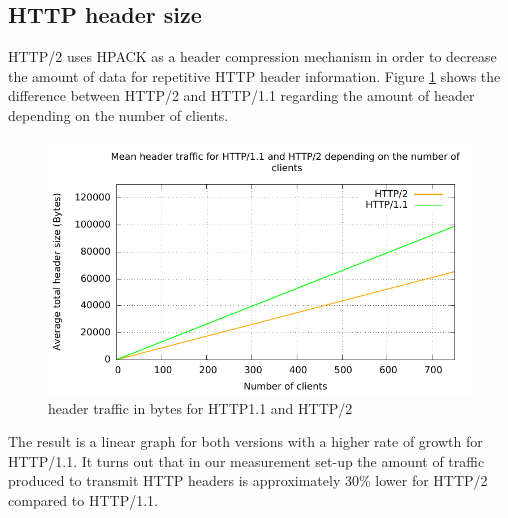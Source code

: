 \subsection{HTTP header size}
\label{subsec:header_size}

HTTP/2 uses HPACK \cite{hpack} as a header compression mechanism in order to decrease the amount of data for repetitive HTTP header information. Figure \ref{fig:headersize} shows the difference between HTTP/2 and HTTP/1.1 regarding the amount of header depending on the number of clients.

\begin{figure}[H]
	\centering
	\includegraphics[scale=1,trim=0.0cm .0cm .0cm .0cm,clip]{images/headertraffic.pdf}
	\caption{header traffic in bytes for HTTP1.1 and HTTP/2}
	\label{fig:headersize}
\end{figure}

The result is a linear graph for both versions with a higher rate of growth for HTTP/1.1. It turns out that in our measurement set-up the amount of traffic produced to transmit HTTP headers is approximately 30\% lower for HTTP/2 compared to HTTP/1.1. 
